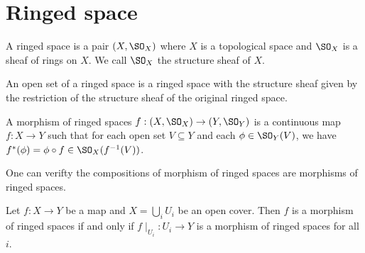 \documentclass[12pt]{scrartcl}
\begin{document}
\section{Ringed space}
\begin{definition}
    A ringed space is a pair $(X,\SO_X)$ where $X$ is a topological space and $\SO_X$ is a sheaf of rings on $X$. We call $\SO_X$ the structure sheaf of $X$.
\end{definition}
An open set of a ringed space is a ringed space with the structure sheaf given by the restriction of the structure sheaf of the original ringed space. 
\begin{definition}
    A morphism of ringed spaces $f:(X,\SO_X)\to (Y,\SO_Y)$ is a continuous map $f:X\to Y$ such that for each open set $V\subseteq Y$ and each $\phi\in \SO_Y(V)$, we have $f^*(\phi)=\phi\circ f\in \SO_X(f^{-1}(V))$.
\end{definition}
One can verifty the compositions of morphism of ringed spaces are morphisms of ringed spaces. 
\begin{proposition}
    Let $f: X\to Y$ be a map and $X=\bigcup_i U_i$ be an open cover. Then $f$ is a morphism of ringed spaces if and only if $f\mid_{U_i}: U_i\to Y$ is a morphism of ringed spaces for all $i$.
\end{proposition}
\end{document}
